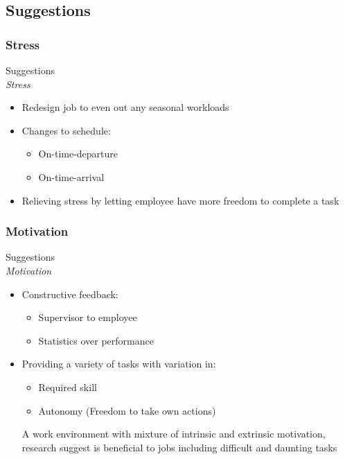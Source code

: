 \subsection{Suggestions}
\subsubsection{Stress}
\begin{frame}{Suggestions\\\small\textit{Stress}}{}
    \begin{itemize}
        \item Redesign job to even out any seasonal workloads
        \item Changes to schedule:
            \begin{itemize}
                \item On-time-departure
                \item On-time-arrival
            \end{itemize}
        \item Relieving stress by letting employee have more freedom to complete a task
    \end{itemize}
\end{frame}

\subsubsection{Motivation}
\begin{frame}{Suggestions\\\small\textit{Motivation}}{}
    \begin{itemize}
        \item Constructive feedback:
            \begin{itemize}
                \item Supervisor to employee
                \item Statistics over performance
            \end{itemize}
        \item Providing a variety of tasks with variation in:
            \begin{itemize}
                \item Required skill
                \item Autonomy (Freedom to take own actions)
            \end{itemize}
            A work environment with mixture of intrinsic and extrinsic motivation, research suggest is beneficial to jobs including difficult and daunting tasks
    \end{itemize}
\end{frame}